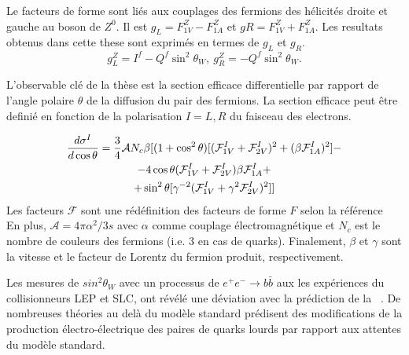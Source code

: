 Le facteurs de forme sont liés aux couplages des fermions des hélicités droite et gauche au boson de $Z^0$. Il est $g_L = F^Z_{1V} - F^Z_{1A}$  et $gR = F^Z_{1V} + F^Z_{1A}$.
Les resultats obtenus dans cette these sont exprimés en termes de $g_L$ et $g_R$.  
\begin{equation}
g_L^Z = I^f - Q^f\sin^2\theta_W, \  g_R^Z = -Q^f\sin^2\theta_W.
\label{formula:EWcouplings_3F}
\end{equation}

L'observable clé de la thèse est la section efficace differentielle par rapport de l'angle polaire $\theta$ de la diffusion du pair des fermions. La section efficace peut être definié en fonction de la polarisation $I=L, R$ du faisceau des electrons.    

\begin{multline}
\label{formula:DiffSigma_3F}
\frac{d\sigma^I}{d\cos\theta} = \frac{3}{4} \mathcal{A} N_c \beta[ (1+\cos^2\theta) [(\mathcal{F}^I_{1V}+\mathcal{F}^I_{2V})^2+(\beta \mathcal{F}^I_{1A})^2] - \\-4 \cos\theta (\mathcal{F}^I_{1V}+\mathcal{F}^I_{2V})\beta \mathcal{F}^I_{1A} +\\+ \sin^2\theta [\gamma ^{-2} (\mathcal{F}^I_{1V} +\gamma^2 \mathcal{F}^I_{2V})^2] ]
\end{multline}
Les facteurs $\mathcal{F}$ sont une rédéfinition des facteurs de forme $F$ selon la référence~\cite{bib:Schmidt}
En plus, $\mathcal{A} = 4\pi\alpha^2/3s$ avec $\alpha$ comme couplage électromagnétique et $N_c$ est le nombre de couleurs des fermions (i.e. 3 en cas de quarks). Finalement, $\beta$ et $\gamma$ sont la vitesse et le facteur de Lorentz du fermion produit, respectivement.

Les mesures de $sin^2\theta_W$ avec un processus de $e^+e^- \to b \bar{b}$ aux les expériences du collisionneurs LEP et SLC, ont révélé une déviation avec la prédiction de la \sm~\cite{bib:AfbSMFit}.
De nombreuses théories au delà du modèle standard prédisent des modifications de la production électro-électrique des paires de quarks lourds par rapport aux attentes du modèle standard.
\newpage
